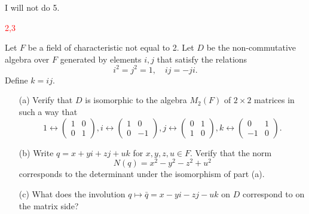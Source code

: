 \documentclass[openany]{book}
\begin{document}
{I will not do 5.}

\textcolor{red}{2,3}

\begin{prob}
    Let \(F\) be a field of characteristic not equal to 2. Let \(D\) be the non-commutative algebra over \(F\) generated by elements \(i,j\) that satisfy the relations
    \[i^2 = j^2 = 1, \quad ij = -ji.\]
    Define \(k = ij.\)
    \begin{itemize}
        \item[(a)] Verify that \(D\) is isomorphic to the algebra \(M_2(F)\) of \(2 \times 2\) matrices in such a way that
        \[1 \leftrightarrow \begin{pmatrix} 1 & 0 \\ 0 & 1 \end{pmatrix}, i \leftrightarrow \begin{pmatrix} 1 & 0 \\ 0 & -1 \end{pmatrix}, j \leftrightarrow \begin{pmatrix} 0 & 1 \\ 1 & 0 \end{pmatrix}, k \leftrightarrow \begin{pmatrix} 0 & 1 \\ -1 & 0 \end{pmatrix}.\]
        \item[(b)] Write \(q = x + yi + zj + uk\) for \(x,y,z,u \in F\). Verify that the norm
        \[N(q) = x^2 - y^2 - z^2 + u^2\]
        corresponds to the determinant under the isomorphism of part (a).
        \item[(c)] What does the involution \(q \mapsto \bar{q} = x - yi - zj - uk\) on \(D\) correspond to on the matrix side?
    \end{itemize}
\end{prob}
\end{document}
